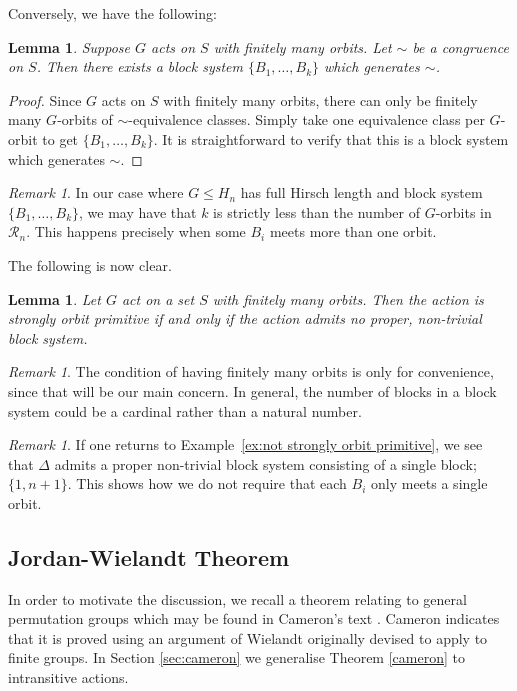 \documentclass[11pt,a4paper]{amsart}
\newtheorem{lemma}[theorem]{Lemma}
\theoremstyle{definition}
\theoremstyle{remark}
\newtheorem{remark}[theorem]{Remark}
\newcommand{\Ra}{\mathcal{R}}
\begin{document}
Conversely, we have the following: 

\begin{lemma}
	Suppose $G$ acts on $S$ with finitely many orbits. Let $\sim$ be a congruence on $S$. Then there exists a block system $\{ B_1, \ldots, B_k \}$ which generates $\sim$. 
\end{lemma}
\begin{proof}
	Since $G$ acts on $S$ with finitely many orbits, there can only be finitely many $G$-orbits of $\sim$-equivalence classes. Simply take one equivalence class per $G$-orbit to get $\{ B_1, \ldots, B_k \}$. It is straightforward to verify that this is a block system which generates $\sim$.  
\end{proof}

\begin{remark}
	In our case where $G\le H_n$ has full Hirsch length and block system $\{ B_1, \ldots, B_k \}$, we may have that $k$ is strictly less than the number of $G$-orbits in $\Ra_n$. This happens precisely when some $B_i$ meets more than one orbit. 
\end{remark}


The following is now clear. 

\begin{lemma}
	Let $G$ act on a set $S$ with finitely many orbits. Then the action is strongly orbit primitive if and only if the action admits no proper, non-trivial block system.  
\end{lemma}

\begin{remark}
	The condition of having finitely many orbits is only for convenience, since that will be our main concern. In general, the number of blocks in a block system could be a cardinal rather than a natural number. 
\end{remark}


\begin{remark}
	If one returns to Example~\ref{ex:not strongly orbit primitive}, we see that $\Delta$ admits a proper non-trivial block system consisting of a single block; $\{ 1, n+1\}$.	This shows how we do not require that each $B_i$ only meets a single orbit. 
\end{remark}

\subsection*{Jordan-Wielandt Theorem}

In order to motivate the discussion, we recall a theorem relating to general permutation groups which may be found in Cameron's text \cite{CameronPG}. Cameron indicates that it is proved using an argument of Wielandt originally devised to apply to finite groups. In Section \ref{sec:cameron} we generalise Theorem \ref{cameron} to intransitive actions.
\end{document}
